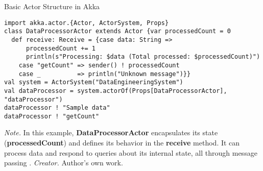 \begin{table}[H]
\caption{Basic Actor Structure in Akka}
\begin{lstlisting}
import akka.actor.{Actor, ActorSystem, Props}
class DataProcessorActor extends Actor {var processedCount = 0
  def receive: Receive = {case data: String =>
      processedCount += 1
      println(s"Processing: $data (Total processed: $processedCount)")
    case "getCount" => sender() ! processedCount
    case _          => println("Unknown message")}}
val system = ActorSystem("DataEngineeringSystem")
val dataProcessor = system.actorOf(Props[DataProcessorActor], "dataProcessor")
dataProcessor ! "Sample data"
dataProcessor ! "getCount"
\end{lstlisting}
\small
\textit{Note.} In this example, \textbf{DataProcessorActor} encapsulates its state (\textbf{processedCount}) and defines its behavior in the \textbf{receive} method. It can process data and respond to queries about its internal state, all through message passing .
\textit{Creator.} Author's own work.
\end{table}